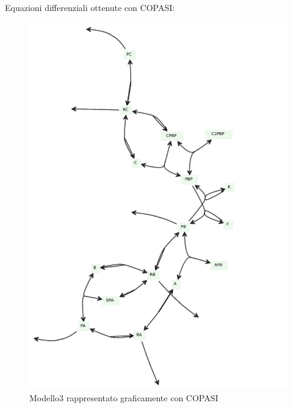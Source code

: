 \documentclass{article}
\begin{document}
Equazioni differenziali ottenute con COPASI:
\scriptsize{
  
}
\newpage
\noindent
\begin{figure}[H]
  \centering
  \includegraphics[width = \textwidth]{img/model.pdf}
  \caption{Modello3 rappresentato graficamente con COPASI}
  \label{fig:model3}
\end{figure}
\end{document}
